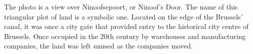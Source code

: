 \documentclass{article}[11pt]
\begin{document}

The photo is a view over Ninoofsepoort, or Ninoof's Door. The name of this triangular plot of land is a symbolic one. Located on the edge of the Brussels' canal, it was once a city gate that provided entry to the historical city centre of Brussels. Once occupied in the 20th century by warehouses and manufacturing companies, the land was left unused as the companies moved.
\end{document}
